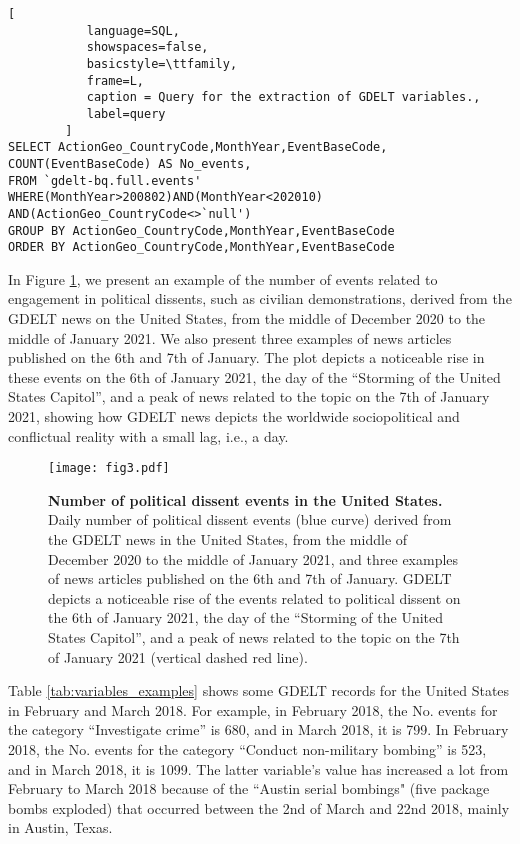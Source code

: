 \documentclass{bmcart}
\begin{document}
\begin{scriptsize}
\begin{lstlisting}[
           language=SQL,
           showspaces=false,
           basicstyle=\ttfamily,  
           frame=L,
           caption = Query for the extraction of GDELT variables.,
           label=query
        ]
SELECT ActionGeo_CountryCode,MonthYear,EventBaseCode,
COUNT(EventBaseCode) AS No_events,
FROM `gdelt-bq.full.events' 
WHERE(MonthYear>200802)AND(MonthYear<202010)
AND(ActionGeo_CountryCode<>`null')
GROUP BY ActionGeo_CountryCode,MonthYear,EventBaseCode
ORDER BY ActionGeo_CountryCode,MonthYear,EventBaseCode 
\end{lstlisting}
\end{scriptsize}

In Figure \ref{fig:news_example_USA}, we present an example of the number of events related to engagement in political dissents, such as civilian demonstrations, derived from the GDELT news on the United States, from the middle of December 2020 to the middle of January 2021. 
We also present three examples of news articles published on the 6th and 7th of January. 
The plot depicts a noticeable rise in these events on the 6th of January 2021, the day of the ``Storming of the United States Capitol'', and a peak of news related to the topic on the 7th of January 2021, showing how GDELT news depicts the worldwide sociopolitical and conflictual reality with a small lag, i.e., a day.

\begin{figure}
\centering
\texttt{[image: fig3.pdf]}
\caption{\textbf{Number of political dissent events in the United States.} Daily number of political dissent events (blue curve) derived from the GDELT news in the United States, from the middle of December 2020 to the middle of January 2021, and three examples of news articles published on the 6th and 7th of January. GDELT depicts a noticeable rise of the events related to political dissent on the 6th of January 2021, the day of the ``Storming of the United States Capitol'', and a peak of news related to the topic on the 7th of January 2021 (vertical dashed red line).}
\label{fig:news_example_USA}
\end{figure}

Table \ref{tab:variables_examples} shows some GDELT records for the United States in February and March 2018. 
For example, in February 2018, the No. events for the category ``Investigate crime'' is 680, and in March 2018, it is 799. In February 2018, the No. events for the category ``Conduct non-military bombing'' is 523, and in March 2018, it is 1099. 
The latter variable's value has increased a lot from February to March 2018 because of the ``Austin serial bombings" (five package bombs exploded) that occurred between the 2nd of March and 22nd 2018, mainly in Austin, Texas. 
\end{document}
